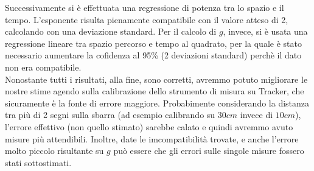 \documentclass[12pt, a4paper]{article}
\begin{document}
Successivamente si è effettuata una regressione di potenza tra lo spazio e il tempo. L'esponente risulta pienamente compatibile con il valore atteso di 2, calcolando con una deviazione standard.
Per il calcolo di $g$, invece, si è usata una regressione lineare tra spazio percorso e tempo al quadrato, per la quale è stato necessario aumentare la cofidenza al 95\% (2 deviazioni standard) perchè il dato non era compatibile. \\

Nonostante tutti i risultati, alla fine, sono corretti, avremmo potuto migliorare le nostre stime agendo sulla calibrazione dello strumento di misura su Tracker, che  sicuramente è la fonte di errore maggiore. Probabimente considerando la distanza tra più di 2 segni sulla sbarra (ad esempio calibrando su $30cm$ invece di $10cm$), l'errore effettivo (non quello stimato) sarebbe calato e quindi avremmo avuto misure più attendibili.
Inoltre, date le imcompatibilità trovate, e anche l'errore molto piccolo risultante su $g$ può essere che gli errori sulle singole misure fossero stati sottostimati.





\newpage
\end{document}
